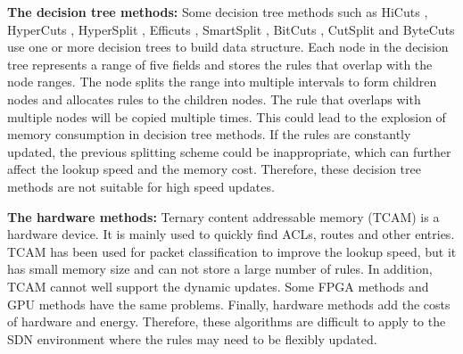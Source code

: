 \textbf{The decision tree methods:} Some decision tree methods such as HiCuts \cite{gupta1999packet}, HyperCuts \cite{george2003packet}, HyperSplit \cite{qi2009packet}, Efficuts \cite{vamanan2011efficuts}, SmartSplit \cite{he2014meta}, BitCuts \cite{liu2015bitcuts}, CutSplit \cite{li2018cutsplit} and ByteCuts \cite{daly2018bytecuts} use one or more decision trees to build data structure. Each node in the decision tree represents a range of five fields and stores the rules that overlap with the node ranges. The node splits the range into multiple intervals to form children nodes and allocates rules to the children nodes. The rule that overlaps with multiple nodes will be copied multiple times. This could lead to the explosion of memory consumption in decision tree methods.  If the rules are constantly updated, the previous splitting scheme could be inappropriate, which can further affect the lookup speed and the memory cost. Therefore, these decision tree methods are not suitable for high speed updates.






\textbf{The hardware methods:} Ternary content addressable memory (TCAM) is a hardware device. It is mainly used to quickly find ACLs, routes and other entries. TCAM has been used for packet classification \cite{lakshminarayanan2005algorithms, pao2006efficient, bremler2010space, che2008dres, liu2010tcam, ma2012smart} to improve the lookup speed, but it has small memory size and can not store a large number of rules. In addition, TCAM cannot well support the dynamic updates. Some FPGA methods \cite{fong2012parasplit, chang2018fast} and GPU methods \cite{varvello2016multilayer, chiu2018design} have the same problems. Finally, hardware methods add the costs of hardware and energy. Therefore, these algorithms are difficult to apply to the SDN environment where the rules may need to be flexibly updated.